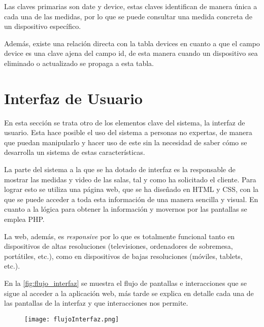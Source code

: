 Las claves primarias son date y device, estas claves identifican de manera única a cada una de las medidas, por lo que se puede consultar una medida concreta de un dispositivo específico.

Además, existe una relación directa con la tabla devices en cuanto a que el campo device es una clave ajena del campo id, de esta manera cuando un dispositivo sea eliminado o actualizado se propaga a esta tabla.

\section{Interfaz de Usuario}\label{sec:interfaz}
En esta sección se trata otro de los elementos clave del sistema, la interfaz de usuario. Esta hace posible el uso del sistema a personas no expertas, de manera que puedan manipularlo y hacer uso de este sin la necesidad de saber cómo se desarrolla un sistema de estas características.

La parte del sistema a la que se ha dotado de interfaz es la responsable de mostrar las medidas y video de las salas, tal y como ha solicitado el cliente. Para lograr esto se utiliza una página web, que se ha diseñado en HTML y CSS, con la que se puede acceder a toda esta información de una manera sencilla y visual. En cuanto a la lógica para obtener la información y movernos por las pantallas se emplea PHP\@.

La web, además, es \textit{responsive} por lo que es totalmente funcional tanto en dispositivos de altas resoluciones (televisiones, ordenadores de sobremesa, portátiles, etc.), como en dispositivos de bajas resoluciones (móviles, tablets, etc.).

En la \autoref{fig:flujo_interfaz} se muestra el flujo de pantallas e interacciones que se sigue al acceder a la aplicación web, más tarde se explica en detalle cada una de las pantallas de la interfaz y que interacciones nos permite.
\begin{figure}[H]
	{\texttt{[image: flujoInterfaz.png]}}
\end{figure}

